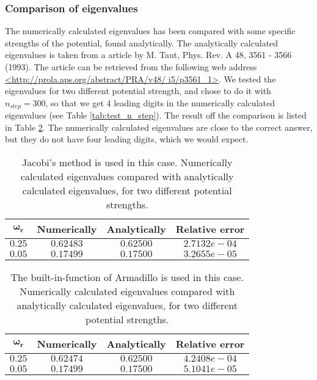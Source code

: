 \documentclass[12pt]{article}
\begin{document}
\begin{flushleft}
\subsubsection{Comparison of eigenvalues}
The numerically calculated eigenvalues has been compared with some specific strengths of the potential, found analytically. The analytically calculated eigenvalues is taken from a article by M. Taut, Phys. Rev. A 48, 3561 - 3566 (1993). The article can be retrieved from the following web address \url{<http://prola.aps.org/abstract/PRA/v48/ i5/p3561_1>}.
\newpage
We tested the eigenvalues for two different potential strength, and chose to do it with $n_{step} = 300$, so that we get 4 leading digits in the numerically calculated eigenvalues (see Table \ref{tab:test_n_step}). The result off the comparison is listed in Table \ref{tab:comparison}. The numerically calculated eigenvalues are close to the correct answer, but they do not have four leading digits, which we would expect.
\vspace{5mm}
\begin{table}[!h]
\begin{center}
\begin{tabular}{| c | c | c | c |}
	\hline
	$\boldsymbol{\omega_r}$ & \textbf{Numerically} & \textbf{Analytically} & \textbf{Relative error}\\
	\hline
	$0.25$ & $ 0.62483$ & $0.62500$ & $2.7132e-04$\\	
	$0.05$ & $0.17499$ & $0.17500$ & $3.2655e-05$\\	
  \hline
\end{tabular}
\end{center}
\caption{\label{tab:comparison}Jacobi's method is used in this case. Numerically calculated eigenvalues compared with analytically calculated eigenvalues, for two different potential strengths.}
\end{table}

\begin{table}[!h]
\begin{center}
\begin{tabular}{| c | c | c | c |}
	\hline
	$\boldsymbol{\omega_r}$ & \textbf{Numerically} & \textbf{Analytically} & \textbf{Relative error}\\
	\hline
	$0.25$ & $0.62474$ & $0.62500$ & $4.2408e-04$\\	
	$0.05$ & $0.17499$ & $0.17500$ & $5.1041e-05$\\	
  \hline
\end{tabular}
\end{center}
\caption{\label{tab:comparison}The built-in-function of Armadillo is used in this case. Numerically calculated eigenvalues compared with analytically calculated eigenvalues, for two different potential strengths.}
\end{table}


\end{flushleft}
\end{document}
